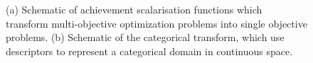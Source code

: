 \begin{figure}

    \caption{(a) Schematic of achievement scalarisation functions which transform multi-objective optimization problems into single objective problems. (b) Schematic of the categorical transform, which use descriptors to represent a categorical domain in continuous space.}
    \label{fig:transforms}
\end{figure}

